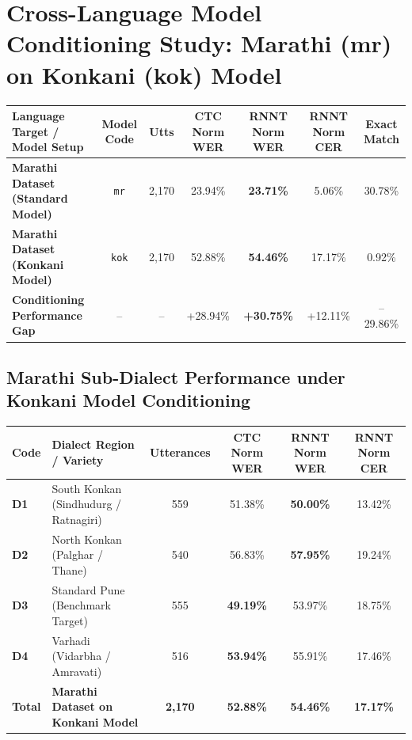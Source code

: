 \documentclass[10pt]{article}
\begin{document}
\section*{Cross-Language Model Conditioning Study: Marathi (mr) on Konkani (kok) Model}

\begin{table}[h!]
\centering
\small
\setlength{\tabcolsep}{4pt}
\begin{tabular}{lcccccc}
\toprule
\textbf{Language Target / Model Setup} & \textbf{Model Code} & \textbf{Utts} & \textbf{CTC Norm WER} & \textbf{RNNT Norm WER} & \textbf{RNNT Norm CER} & \textbf{Exact Match} \\
\midrule
\textbf{Marathi Dataset (Standard Model)} & \texttt{mr} & 2,170 & 23.94\% & \textbf{23.71\%} & 5.06\% & 30.78\% \\
\textbf{Marathi Dataset (Konkani Model)}  & \texttt{kok}& 2,170 & 52.88\% & \textbf{54.46\%} & 17.17\% & 0.92\% \\
\midrule
\textbf{Conditioning Performance Gap}     & --          & --    & +28.94\% & \textbf{+30.75\%} & +12.11\% & --29.86\% \\
\bottomrule
\end{tabular}
\end{table}

\subsection*{Marathi Sub-Dialect Performance under Konkani Model Conditioning}
\begin{table}[h!]
\centering
\small
\setlength{\tabcolsep}{4pt}
\begin{tabular}{llcccc}
\toprule
\textbf{Code} & \textbf{Dialect Region / Variety} & \textbf{Utterances} & \textbf{CTC Norm WER} & \textbf{RNNT Norm WER} & \textbf{RNNT Norm CER} \\
\midrule
\textbf{D1} & South Konkan (Sindhudurg / Ratnagiri) & 559 & 51.38\% & \textbf{50.00\%} & 13.42\% \\
\textbf{D2} & North Konkan (Palghar / Thane)       & 540 & 56.83\% & \textbf{57.95\%} & 19.24\% \\
\textbf{D3} & Standard Pune (Benchmark Target)     & 555 & \textbf{49.19\%} & 53.97\% & 18.75\% \\
\textbf{D4} & Varhadi (Vidarbha / Amravati)        & 516 & \textbf{53.94\%} & 55.91\% & 17.46\% \\
\midrule
\textbf{Total} & \textbf{Marathi Dataset on Konkani Model} & \textbf{2,170} & \textbf{52.88\%} & \textbf{54.46\%} & \textbf{17.17\%} \\
\bottomrule
\end{tabular}
\end{table}
\end{document}

